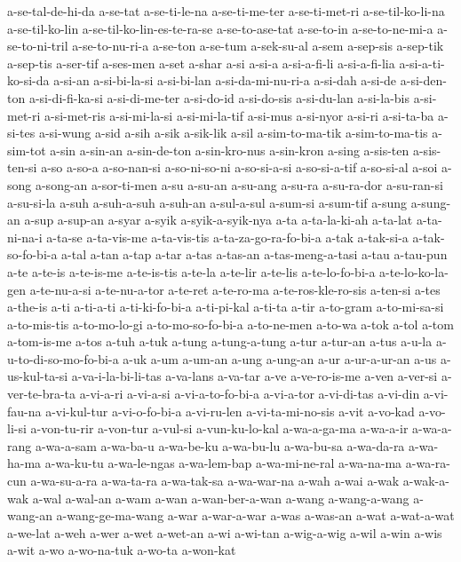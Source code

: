 {a-se-tal-de-hi-da a-se-tat a-se-ti-le-na a-se-ti-me-ter a-se-ti-met-ri
a-se-til-ko-li-na a-se-til-ko-lin a-se-til-ko-lin-es-te-ra-se
a-se-to-ase-tat a-se-to-in a-se-to-ne-mi-a a-se-to-ni-tril a-se-to-nu-ri-a
a-se-ton a-se-tum a-sek-su-al a-sem a-sep-sis a-sep-tik a-sep-tis
a-ser-tif a-ses-men a-set a-shar a-si a-si-a a-si-a-fi-li a-si-a-fi-lia
a-si-a-ti-ko-si-da a-si-an a-si-bi-la-si a-si-bi-lan a-si-da-mi-nu-ri-a
a-si-dah a-si-de a-si-den-ton a-si-di-fi-ka-si a-si-di-me-ter a-si-do-id
a-si-do-sis a-si-du-lan a-si-la-bis a-si-met-ri a-si-met-ris a-si-mi-la-si
a-si-mi-la-tif a-si-mus a-si-nyor a-si-ri a-si-ta-ba a-si-tes a-si-wung
a-sid a-sih a-sik a-sik-lik a-sil a-sim-to-ma-tik a-sim-to-ma-tis
a-sim-tot a-sin a-sin-an a-sin-de-ton a-sin-kro-nus a-sin-kron a-sing
a-sis-ten a-sis-ten-si a-so a-so-a a-so-nan-si a-so-ni-so-ni a-so-si-a-si
a-so-si-a-tif a-so-si-al a-soi a-song a-song-an a-sor-ti-men a-su a-su-an
a-su-ang a-su-ra a-su-ra-dor a-su-ran-si a-su-si-la a-suh a-suh-a-suh
a-suh-an a-sul-a-sul a-sum-si a-sum-tif a-sung a-sung-an a-sup a-sup-an
a-syar a-syik a-syik-a-syik-nya a-ta a-ta-la-ki-ah a-ta-lat a-ta-ni-na-i
a-ta-se a-ta-vis-me a-ta-vis-tis a-ta-za-go-ra-fo-bi-a a-tak a-tak-si-a
a-tak-so-fo-bi-a a-tal a-tan a-tap a-tar a-tas a-tas-an a-tas-meng-a-tasi
a-tau a-tau-pun a-te a-te-is a-te-is-me a-te-is-tis a-te-la a-te-lir
a-te-lis a-te-lo-fo-bi-a a-te-lo-ko-la-gen a-te-nu-a-si a-te-nu-a-tor
a-te-ret a-te-ro-ma a-te-ros-kle-ro-sis a-ten-si a-tes a-the-is a-ti
a-ti-a-ti a-ti-ki-fo-bi-a a-ti-pi-kal a-ti-ta a-tir a-to-gram
a-to-mi-sa-si a-to-mis-tis a-to-mo-lo-gi a-to-mo-so-fo-bi-a a-to-ne-men
a-to-wa a-tok a-tol a-tom a-tom-is-me a-tos a-tuh a-tuk a-tung
a-tung-a-tung a-tur a-tur-an a-tus a-u-la a-u-to-di-so-mo-fo-bi-a a-uk
a-um a-um-an a-ung a-ung-an a-ur a-ur-a-ur-an a-us a-us-kul-ta-si
a-va-i-la-bi-li-tas a-va-lans a-va-tar a-ve a-ve-ro-is-me a-ven a-ver-si
a-ver-te-bra-ta a-vi-a-ri a-vi-a-si a-vi-a-to-fo-bi-a a-vi-a-tor
a-vi-di-tas a-vi-din a-vi-fau-na a-vi-kul-tur a-vi-o-fo-bi-a a-vi-ru-len
a-vi-ta-mi-no-sis a-vit a-vo-kad a-vo-li-si a-von-tu-rir a-von-tur
a-vul-si a-vun-ku-lo-kal a-wa-a-ga-ma a-wa-a-ir a-wa-a-rang a-wa-a-sam
a-wa-ba-u a-wa-be-ku a-wa-bu-lu a-wa-bu-sa a-wa-da-ra a-wa-ha-ma
a-wa-ku-tu a-wa-le-ngas a-wa-lem-bap a-wa-mi-ne-ral a-wa-na-ma a-wa-ra-cun
a-wa-su-a-ra a-wa-ta-ra a-wa-tak-sa a-wa-war-na a-wah a-wai a-wak
a-wak-a-wak a-wal a-wal-an a-wam a-wan a-wan-ber-a-wan a-wang
a-wang-a-wang a-wang-an a-wang-ge-ma-wang a-war a-war-a-war a-was a-was-an
a-wat a-wat-a-wat a-we-lat a-weh a-wer a-wet a-wet-an a-wi a-wi-tan
a-wig-a-wig a-wil a-win a-wis a-wit a-wo a-wo-na-tuk a-wo-ta a-won-kat
}
